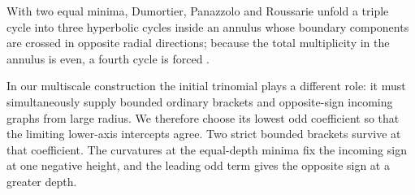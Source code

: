 With two equal minima, Dumortier, Panazzolo and Roussarie unfold a
triple cycle into three hyperbolic cycles inside an annulus whose
boundary components are crossed in opposite radial directions; because
the total multiplicity in the annulus is even, a fourth cycle is forced
\cite[Theorem~1.3 and p.~1898]{DPR}.

In our multiscale construction the initial trinomial plays a different
role: it must simultaneously supply bounded ordinary brackets and
opposite-sign incoming graphs from large radius. We therefore choose its
lowest odd coefficient so that the limiting lower-axis intercepts agree.
Two strict bounded brackets survive at that coefficient. The curvatures
at the equal-depth minima fix the incoming sign at one negative height,
and the leading odd term gives the opposite sign at a greater depth.

